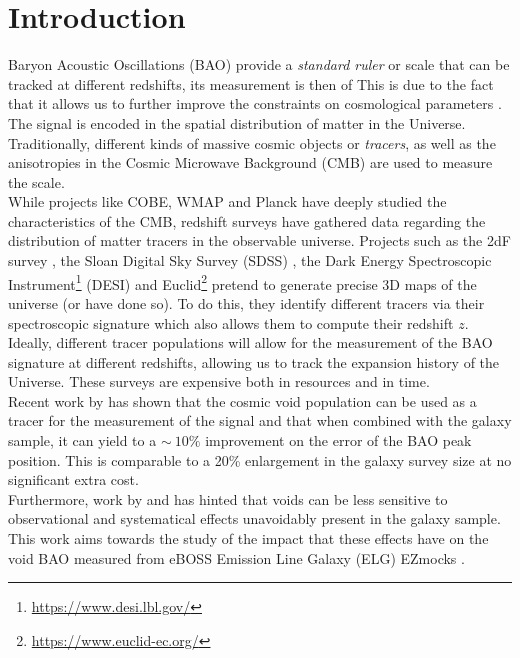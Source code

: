 \documentclass[fleqn, usenatbib]{mnras}
\begin{document}


\section{Introduction}
Baryon Acoustic Oscillations (BAO) provide a \textit{standard ruler} or scale that can be tracked at different redshifts, its measurement is then of This is due to the fact that it allows us to further improve the constraints on cosmological parameters \citep{Bassett2010}. The signal is encoded in the spatial distribution of matter in the Universe. Traditionally, different kinds of massive cosmic objects or \textit{tracers}, as well as the anisotropies in the Cosmic Microwave Background (CMB) are used to measure the scale.\\
While projects like COBE, WMAP and Planck have deeply studied the characteristics of the CMB, redshift surveys have gathered data regarding the distribution of matter tracers in the observable universe. Projects such as the 2dF survey \citep{Colless2001}, the Sloan Digital Sky Survey (SDSS) \citep{Dawson2015}, the Dark Energy Spectroscopic Instrument\footnote{\url{https://www.desi.lbl.gov/}} (DESI) and Euclid\footnote{\url{https://www.euclid-ec.org/}} pretend to generate precise 3D maps of the universe (or have done so). To do this, they identify different tracers via their spectroscopic signature which also allows them to compute their redshift $z$. Ideally, different tracer populations will allow for the measurement of the BAO signature at different redshifts, allowing us to track the expansion history of the Universe. These surveys are expensive both in resources and in time.\\
Recent work by \citet{Zhao2019} has shown that the cosmic void population can be used as a tracer for the measurement of the signal and that when combined with the galaxy sample, it can yield to a $\sim~10\%$ improvement on the error of the BAO peak position. This is comparable to a 20\% enlargement in the galaxy survey size at no significant extra cost.\\
Furthermore, work by \citet{Kitaura2016} and \citet{Liang2016} has hinted that voids can be less sensitive to observational and systematical effects unavoidably present in the galaxy sample. This work aims towards the study of the impact that these effects have on the void BAO measured from eBOSS Emission Line Galaxy (ELG) EZmocks \citep{Chuang2015a, Zhao2020}.\\
\end{document}
